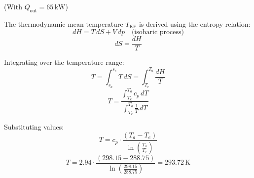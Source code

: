 (With \( Q_{\text{out}} = 65 \, \text{kW} \))  

The thermodynamic mean temperature \( T_{\text{KF}} \) is derived using the entropy relation:  
\[
dH = T \, dS + V \, dp \quad \text{(isobaric process)}
\]  
\[
dS = \frac{dH}{T}
\]  

Integrating over the temperature range:  
\[
T = \int_{s_a}^{s_e} T \, dS = \int_{T_e}^{T_a} \frac{dH}{T}
\]  
\[
T = \frac{\int_{T_e}^{T_a} c_p \, dT}{\int_{T_e}^{T_a} \frac{1}{T} \, dT}
\]  

Substituting values:  
\[
T = c_p \cdot \frac{(T_a - T_e)}{\ln \left( \frac{T_a}{T_e} \right)}
\]  
\[
T = 2.94 \cdot \frac{(298.15 - 288.75)}{\ln \left( \frac{298.15}{288.75} \right)} = 293.72 \, \text{K}
\]